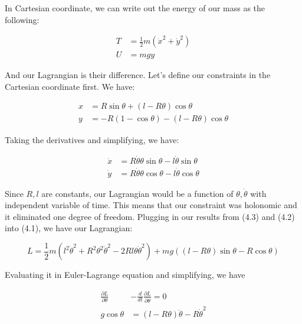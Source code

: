 \documentclass{article}
\numberwithin{equation}{section}
\begin{document}
In Cartesian coordinate, we can write out the energy of our mass as the following:

\begin{equation}
\begin{split}
    T &= \frac{1}{2} m (\dot{x}^2 + \dot{y}^2) \\
    U &= mgy
\end{split}
\end{equation}

And our Lagrangian is their difference. Let's define our constraints in the Cartesian coordinate first. We have:

\begin{equation}
\begin{split}
        x &= R \sin \theta + (l - R \theta) \cos \theta \\
        y &= -R (1 -  \cos \theta) - (l - R \theta) \cos \theta
\end{split}
\end{equation}

Taking the derivatives and simplifying, we have:

\begin{equation}
\begin{split}
\dot{x} &= R \dot{\theta} \theta \sin \theta - l \dot{\theta} \sin \theta \\
\dot{y} &= R \dot{\theta} \theta \cos \theta  - l\dot{\theta} \cos \theta
\end{split}
\end{equation}

Since $R, l$ are constants, our Lagrangian would be a function of $\theta, \dot\theta$ with independent variable of time. This means that our constraint was holonomic and it eliminated one degree of freedom. Plugging in our results from (4.3) and (4.2) into (4.1), we have our Lagrangian:

\begin{equation}
    L = \frac{1}{2} m(l^2 \dot{\theta}^2 + R^2 \theta^2 \dot\theta^2 - 2Rl\theta \dot{\theta}^2) + mg ((l - R \theta) \sin\theta - R \cos \theta) 
\end{equation}

Evaluating it in Euler-Lagrange equation and simplifying, we have

\begin{equation}
    \begin{split}
        \frac{\partial L}{\partial \theta} &- \frac{d}{dt} \frac{\partial L}{\partial \dot{\theta}} = 0 \\
        g \cos \theta &= (l - R \theta )\ddot{\theta} - R \dot{\theta}^2
    \end{split}
\end{equation}
\end{document}
